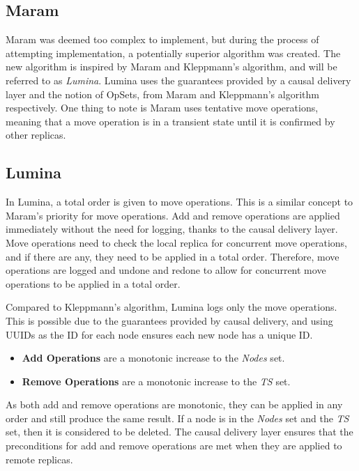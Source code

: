 \documentclass[12pt]{report}
\begin{document}
\subsection{Maram}

Maram \cite{https://doi.org/10.48550/arxiv.2103.04828} was deemed too complex to implement, but during the process of attempting implementation, a potentially superior algorithm was created. The new algorithm is inspired by Maram and Kleppmann's algorithm, and will be referred to as \textit{Lumina}. Lumina uses the guarantees provided by a causal delivery layer and the notion of OpSets, from Maram and Kleppmann's algorithm respectively. One thing to note is Maram uses tentative move operations, meaning that a move operation is in a transient state until it is confirmed by other replicas. 

\subsection{Lumina}
In Lumina, a total order is given to move operations. This is a similar concept to Maram's priority for move operations. Add and remove operations are applied immediately without the need for logging, thanks to the causal delivery layer. Move operations need to check the local replica for concurrent move operations, and if there are any, they need to be applied in a total order. Therefore, move operations are logged and undone and redone to allow for concurrent move operations to be applied in a total order. \par

Compared to Kleppmann's algorithm, Lumina logs only the move operations. This is possible due to the guarantees provided by causal delivery, and using UUIDs as the ID for each node ensures each new node has a unique ID.
\begin{itemize}
    \item \textbf{Add Operations} are a monotonic increase to the \textit{Nodes} set.
    \item \textbf{Remove Operations} are a monotonic increase to the \textit{TS} set.
\end{itemize}
As both add and remove operations are monotonic, they can be applied in any order and still produce the same result. If a node is in the \textit{Nodes} set and the \textit{TS} set, then it is considered to be deleted. The causal delivery layer ensures that the preconditions for add and remove operations are met when they are applied to remote replicas. \par
\end{document}
